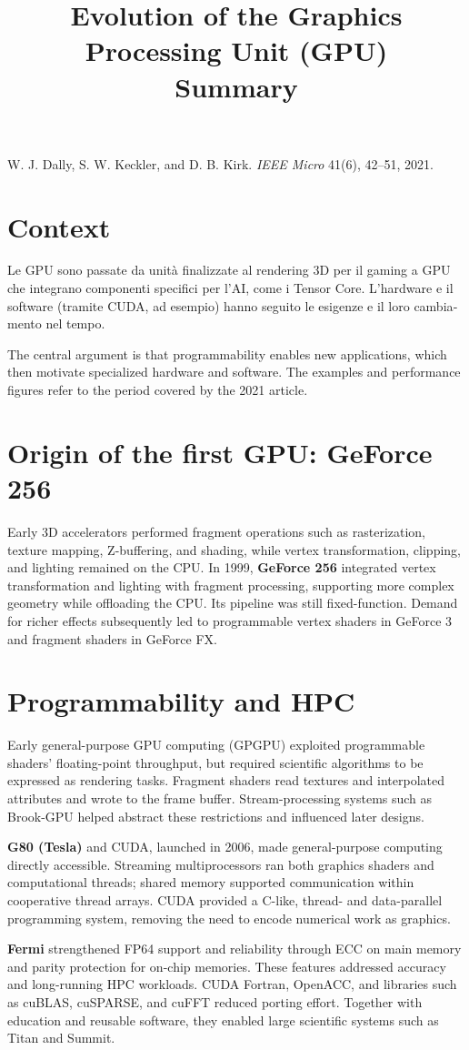 \documentclass[11pt,a4paper]{article}
\title{Evolution of the Graphics Processing Unit (GPU)\\[0.3em]
\large Summary}
\author{}
\date{}
\newcommand{\topic}[1]{\section*{#1}}
\begin{document}
\maketitle
\vspace{-2.7em}
{\small W. J. Dally, S. W. Keckler, and D. B. Kirk.
\emph{IEEE Micro} 41(6), 42--51, 2021.}

\topic{Context}
\begin{otherlanguage}{italian}
Le GPU sono passate da unità finalizzate al rendering 3D per il gaming a GPU
che integrano componenti specifici per l'AI, come i Tensor Core.
L'hardware e il software (tramite CUDA, ad esempio) hanno seguito le esigenze
e il loro cambiamento nel tempo.
\end{otherlanguage}

The central argument is that programmability enables new applications, which
then motivate specialized hardware and software. The examples and performance
figures refer to the period covered by the 2021 article.

\topic{Origin of the first GPU: GeForce 256}
Early 3D accelerators performed fragment operations such as rasterization,
texture mapping, Z-buffering, and shading, while vertex transformation,
clipping, and lighting remained on the CPU. In 1999, \textbf{GeForce 256}
integrated vertex transformation and lighting with fragment processing,
supporting more complex geometry while offloading the CPU. Its pipeline
was still fixed-function. Demand for richer effects subsequently led to
programmable vertex shaders in GeForce 3 and fragment shaders in GeForce FX.

\topic{Programmability and HPC}
Early general-purpose GPU computing (GPGPU) exploited programmable shaders'
floating-point throughput, but required scientific algorithms to be expressed
as rendering tasks. Fragment shaders read textures and interpolated attributes
and wrote to the frame buffer. Stream-processing systems such as Brook-GPU
helped abstract these restrictions and influenced later designs.

\textbf{G80 (Tesla)} and CUDA, launched in 2006, made general-purpose computing
directly accessible. Streaming multiprocessors ran both graphics shaders
and computational threads; shared memory supported communication within
cooperative thread arrays. CUDA provided a C-like, thread- and data-parallel
programming system, removing the need to encode numerical work as graphics.

\textbf{Fermi} strengthened FP64 support and reliability through ECC on main
memory and parity protection for on-chip memories. These features addressed
accuracy and long-running HPC workloads. CUDA Fortran, OpenACC, and libraries
such as cuBLAS, cuSPARSE, and cuFFT reduced porting effort. Together with
education and reusable software, they enabled large scientific systems
such as Titan and Summit.
\end{document}
